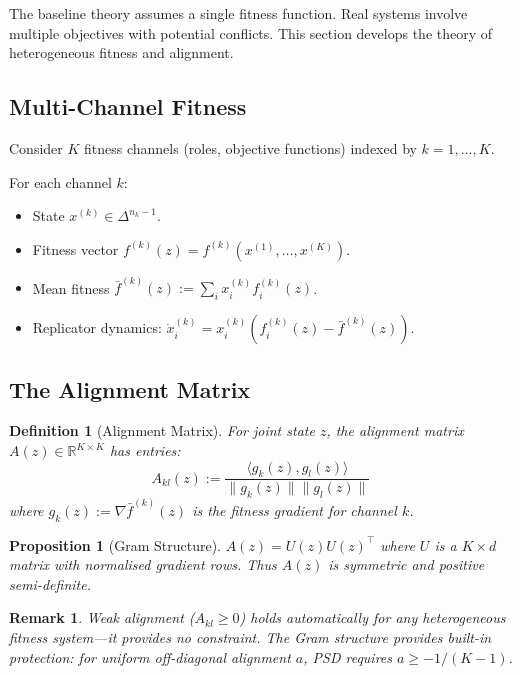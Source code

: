 \documentclass[12pt]{article}
\newtheorem{proposition}[theorem]{Proposition}
\newtheorem{definition}[theorem]{Definition}
\newtheorem{remark}{Remark}[section]
\newcommand{\R}{\mathbb{R}}
\begin{document}
The baseline theory assumes a single fitness function. Real systems involve multiple objectives with potential conflicts. This section develops the theory of heterogeneous fitness and alignment.

\subsection{Multi-Channel Fitness}

Consider $K$ fitness channels (roles, objective functions) indexed by $k = 1, \ldots, K$.

For each channel $k$:
\begin{itemize}
    \item State $x^{(k)} \in \Delta^{n_k - 1}$.
    \item Fitness vector $f^{(k)}(z) = f^{(k)}(x^{(1)}, \ldots, x^{(K)})$.
    \item Mean fitness $\bar{f}^{(k)}(z) := \sum_i x_i^{(k)} f_i^{(k)}(z)$.
    \item Replicator dynamics: $\dot{x}_i^{(k)} = x_i^{(k)}(f_i^{(k)}(z) - \bar{f}^{(k)}(z))$.
\end{itemize}

\subsection{The Alignment Matrix}

\begin{definition}[Alignment Matrix]
For joint state $z$, the \emph{alignment matrix} $A(z) \in \R^{K \times K}$ has entries:
\[
A_{kl}(z) := \frac{\langle g_k(z), g_l(z) \rangle}{\|g_k(z)\| \|g_l(z)\|}
\]
where $g_k(z) := \nabla \bar{f}^{(k)}(z)$ is the fitness gradient for channel $k$.
\end{definition}

\begin{proposition}[Gram Structure]
\label{prop:gram}
$A(z) = U(z) U(z)^\top$ where $U$ is a $K \times d$ matrix with normalised gradient rows. Thus $A(z)$ is symmetric and positive semi-definite.
\end{proposition}

\begin{remark}
Weak alignment ($A_{kl} \geq 0$) holds automatically for any heterogeneous fitness system---it provides no constraint. The Gram structure provides built-in protection: for uniform off-diagonal alignment $a$, PSD requires $a \geq -1/(K-1)$.
\end{remark}
\end{document}
